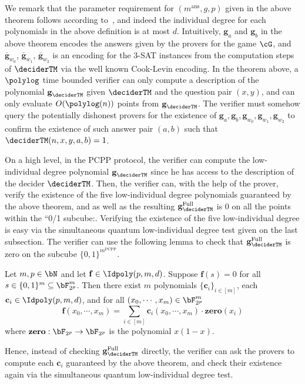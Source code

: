 We remark that the parameter requirement for $(m^{\text{ans}}, g, p)$ given in the above theorem follows according to~\cite[Definition 10.22]{jiMIPRE2022a}, and indeed the individual degree for each polynomials in the above definition is at most $d$. Intuitively, $\textbf{g}_a$ and $\textbf{g}_b$ in the above theorem encodes the answers given by the provers for the game $\cG$, and $\overline{\textbf{g}}_{w_0}$, $\overline{\textbf{g}}_{w_1}$, $\overline{\textbf{g}}_{w_2}$ is an encoding for the 3-SAT instances from the computation steps of $\deciderTM$ via the well known Cook-Levin encoding. In the theorem above, a $\polylog$ time bounded verifier can only compute a description of the polynomial $\textbf{g}_{\deciderTM}$ given $\deciderTM$ and the question pair $(x,y)$, and can only evaluate $O(\polylog(n))$ points from  $\textbf{g}_{\deciderTM}$. The verifier must somehow query the potentially dishonest provers for the existence of $\textbf{g}_a, \textbf{g}_b,\textbf{g}_{w_0}, \textbf{g}_{w_1},\textbf{g}_{w_2}$ to confirm the existence of such answer pair $(a,b)$ such that $\deciderTM(n,x,y,a,b)=1$. 

On a high level, in the PCPP protocol, the verifier can compute the low-individual degree polynomial $\textbf{g}_{\deciderTM}$ since he has access to the description of the decider $\deciderTM$. Then, the verifier can, with the help of the prover, verify the existence of the five low-individual degree polynomials guaranteed by the above theorem, and as well as the resulting $\textbf{g}_{\deciderTM}^{\text{Full}}$ is $0$ on all the points within the ``0/1 subcube:. Verifying the existence of the five low-individual degree is easy via the simultaneous quantum low-individual degree test given on the last subsection. The verifier can use the following lemma to check that $\textbf{g}_{\deciderTM}^{\text{Full}}$ is zero on the subcube $\{0,1\}^{m^{\text{PCPP}}}$. 
\begin{lemma} \label{lem:polyonzero}
	Let $m,p \in \bN$ and let $\mathbf{f} \in \Idpoly(p,m,d)$. Suppose $\mathbf{f}(s) = 0$ for all $s \in \{0,1\}^{m}\subseteq \bF_{2^p}^{m}$. Then there exist $m$ polynomials $\{\textbf{c}_i \}_{i \in [m]}$, each $\textbf{c}_i \in \Idpoly(p,m,d)$, and for all $(x_0, \cdots, x_m) \in \bF_{2^p}^m$
	\begin{equation*}
		\mathbf{f}(x_0, \cdots, x_m) = \sum_{i \in [m]} \textbf{c}_i(x_0, \cdots, x_m) \cdot \mathbf{zero}(x_i)
	\end{equation*}
	where $\mathbf{zero}: \bF_{2^p} \rightarrow \bF_{2^p}$ is the polynomial $x(1-x)$. 
\end{lemma}
Hence, instead of checking $\textbf{g}_{\deciderTM}^{\text{Full}}$ directly, the verifier can ask the provers to compute each $\textbf{c}_i$ guaranteed by the above theorem, and check their existence again via the simultaneous quantum low-individual degree test. 

